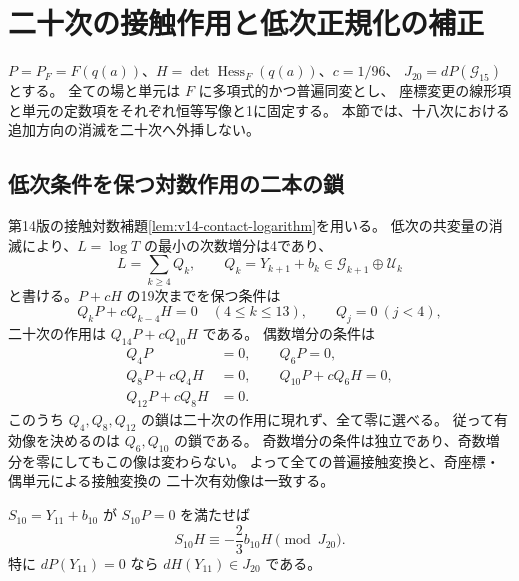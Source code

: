 


\section{二十次の接触作用と低次正規化の補正}
\label{sec:v15-contact-twentieth}

$P=P_F=F(q(a))$、$H=\det\operatorname{Hess}_F(q(a))$、$c=1/96$、
$J_{20}=dP(\mathcal G_{15})$ とする。
全ての場と単元は $F$ に多項式的かつ普遍同変とし、
座標変更の線形項と単元の定数項をそれぞれ恒等写像と1に固定する。
本節では、十八次における追加方向の消滅を二十次へ外挿しない。

\subsection{低次条件を保つ対数作用の二本の鎖}

第14版の接触対数補題\ref{lem:v14-contact-logarithm}を用いる。
低次の共変量の消滅により、$L=\log T$ の最小の次数増分は4であり、
\[
 L=\sum_{k\ge4}Q_k,\qquad
 Q_k=Y_{k+1}+b_k\in\mathcal G_{k+1}\oplus\mathcal U_k
\]
と書ける。$P+cH$ の19次までを保つ条件は
\[
 Q_kP+cQ_{k-4}H=0\quad(4\le k\le13),\qquad Q_j=0\ (j<4),
\]
二十次の作用は $Q_{14}P+cQ_{10}H$ である。
偶数増分の条件は
\begin{equation}\label{eq:v15-even-contact-chain}
 \begin{split}
 Q_4P&=0,\qquad Q_6P=0,\\
 Q_8P+cQ_4H&=0,\qquad Q_{10}P+cQ_6H=0,\\
 Q_{12}P+cQ_8H&=0.
 \end{split}
\end{equation}
このうち $Q_4,Q_8,Q_{12}$ の鎖は二十次の作用に現れず、全て零に選べる。
従って有効像を決めるのは $Q_6,Q_{10}$ の鎖である。
奇数増分の条件は独立であり、奇数増分を零にしてもこの像は変わらない。
よって全ての普遍接触変換と、奇座標・偶単元による接触変換の
二十次有効像は一致する。

\begin{lemma}[十一次の接触安定化場のHessian作用]
\label{lem:v15-eleventh-stabilizer-hessian}
$S_{10}=Y_{11}+b_{10}$ が $S_{10}P=0$ を満たせば
\[
 S_{10}H\equiv-\frac23b_{10}H\pmod{J_{20}}.
\]
特に $dP(Y_{11})=0$ なら $dH(Y_{11})\in J_{20}$ である。
\end{lemma}


